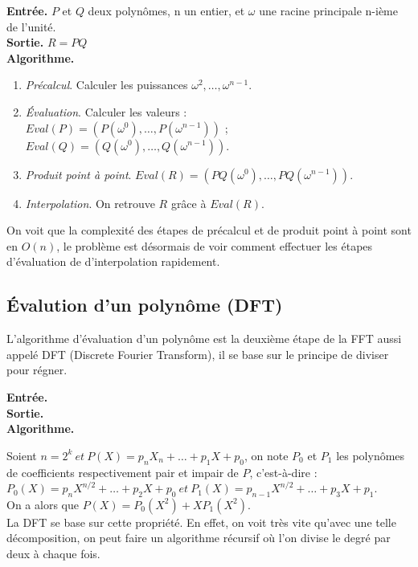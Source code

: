 \documentclass[12pt, a4paper]{article}
\begin{document}
\begin{tcolorbox}[colback=cyan!5!white,
                  colframe=cyan!100!black,
                  title=\textbf{Algorithme FFT (METTRE SOURCES)}
                 ]
\textbf{Entrée.} $P$ et $Q$ deux polynômes, n un entier, et $\omega$ une racine principale n-ième de l’unité. \\
\textbf{Sortie.} $R = PQ$ \\
\textbf{Algorithme.}
\begin{enumerate}[itemsep=-2ex]
\item\textit{Précalcul}. Calculer les puissances $\omega^2,\dots,\omega^{n-1}$. \\
\item\textit{Évaluation}. Calculer les valeurs : \\ $Eval(P)=(P(\omega^0),\dots,P(\omega^{n-1}))$ ; $Eval(Q)=(Q(\omega^0),\dots,Q(\omega^{n-1}))$. \\
\item\textit{Produit point à point}. $Eval(R) = (PQ(\omega^0),\dots,PQ(\omega^{n-1}))$. \\
\item\textit{Interpolation}. On retrouve $R$ grâce à $Eval(R)$.
\end{enumerate}
\end{tcolorbox}
On voit que la complexité des étapes de précalcul et de produit point à point sont en $O(n)$, le problème est désormais de voir comment effectuer les étapes d'évaluation de d'interpolation rapidement.

\subsection{Évalution d'un polynôme (DFT)}

L'algorithme d'évaluation d'un polynôme est la deuxième étape de la FFT aussi appelé DFT (Discrete Fourier Transform), il se base sur le principe de diviser pour régner. 

\begin{tcolorbox}[colback=cyan!5!white,
                  colframe=cyan!100!black,
                  title=\textbf{Algorithme DFT (METTRE SOURCES)}
                 ]
\textbf{Entrée.} \\
\textbf{Sortie.} \\
\textbf{Algorithme.}
\end{tcolorbox}

Soient $n = 2^k\ et\ P(X) = p_n X_n +\dots+p_1 X + p_0$, on note $P_0$ et $P_1$ les polynômes de coefficients respectivement pair et impair de $P$, c'est-à-dire : \\
$P_0(X) = p_{n} X^{n/2} +\dots+ p_2 X + p_0\ et\ P_1(X) = p_{n-1} X^{n/2} +\dots+ p_3 X + p_1$. \\
On a alors que $P(X) = P_0(X^2)+X P_1(X^2)$. \\
La DFT se base sur cette propriété. En effet, on voit très vite qu'avec une telle décomposition, on peut faire un algorithme récursif où l'on divise le degré par deux à chaque fois.
\end{document}
